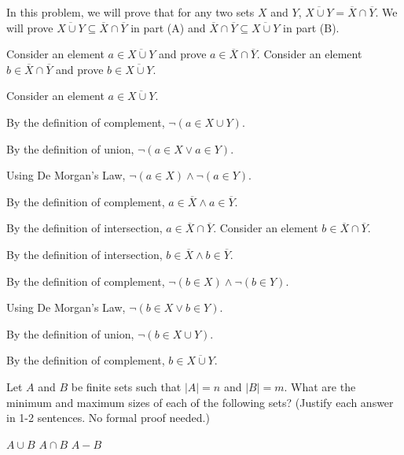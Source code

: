 \documentclass[solution, letterpaper]{cs20}
\begin{document}


In this problem, we will prove that for any two sets $X$ and $Y$, $\overline{X \cup Y} = \overline{X} \cap \overline{Y}$. We will prove $\overline{X \cup Y} \subseteq \overline{X} \cap \overline{Y}$ in part (A) and $\overline{X} \cap \overline{Y} \subseteq \overline{X \cup Y}$ in part (B).

\subproblem Consider an element $a \in \overline{X \cup Y}$ and prove $a \in \overline{X} \cap \overline{Y}$.
\subproblem Consider an element $b \in \overline{X} \cap \overline{Y}$ and prove $b \in \overline{X \cup Y}$.

\begin{solution}
\subsolution Consider an element $a \in \overline{X \cup Y}$. 

By the definition of complement, $\neg (a \in X \cup Y)$. 

By the definition of union, $\neg (a \in X \vee a \in Y)$. 

Using De Morgan's Law, $\neg (a \in X) \wedge \neg (a \in Y)$. 

By the definition of complement, $a \in \overline{X} \wedge a \in \overline{Y}$.

By the definition of intersection, $a \in \overline{X} \cap \overline{Y}$.
\subsolution Consider an element $b \in \overline{X} \cap \overline{Y}$.

By the definition of intersection, $b \in \overline{X} \wedge b \in \overline{Y}$.

By the definition of complement, $\neg (b \in X) \wedge \neg (b \in Y)$.

Using De Morgan's Law, $\neg (b \in X \vee b \in Y)$.

By the definition of union, $\neg (b \in X \cup Y)$.

By the definition of complement, $b \in \overline{X \cup Y}$.

\end{solution}

Let $A$ and $B$ be finite sets such that $|A| = n$ and $|B| = m$. What are the minimum and maximum sizes of each of the following sets? (Justify each answer in 1-2 sentences. No formal proof needed.)

\subproblem $A \cup B$
\subproblem $A \cap B$
\subproblem $A - B$
 
\end{document}
